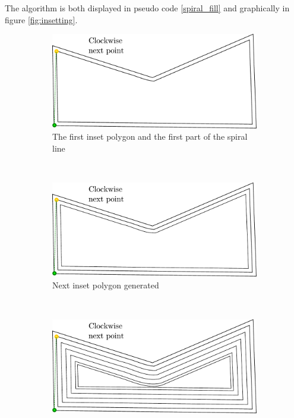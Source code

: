 The algorithm is both displayed in pseudo code \ref{spiral_fill} and graphically in figure \ref{fig:insetting}. 

\begin{figure}[htbp]
	\centering
    \begin{subfigure}[b]{0.45\textwidth}
    		\includegraphics[width=\textwidth]{images/algorithms/spiral_fill/2.pdf}
		\caption{The first inset polygon and the first part of the spiral line}
    \end{subfigure}
    ~
    \begin{subfigure}[b]{0.45\textwidth}
    		\includegraphics[width=\textwidth]{images/algorithms/spiral_fill/3.pdf}
    		\caption{Next inset polygon generated}
    \end{subfigure}\\
    \begin{subfigure}[b]{0.45\textwidth}
    		\includegraphics[width=\textwidth]{images/algorithms/spiral_fill/4.pdf}

\end{subfigure}
\end{figure}

